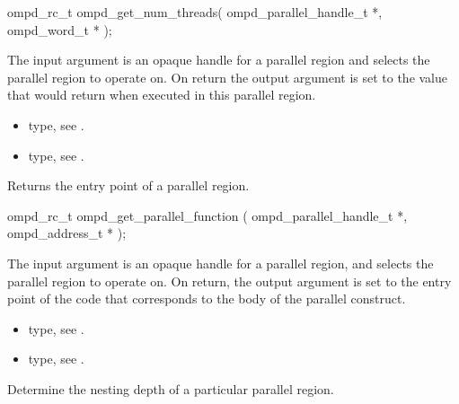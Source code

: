 \format
\cspecificstart
\begin{boxedcode}
ompd\_rc\_t ompd\_get\_num\_threads(
  ompd\_parallel\_handle\_t *,
  ompd\_word\_t *
);
\end{boxedcode}
\cspecificend

\descr

\argdesc
The input argument  is an opaque handle for a parallel region and selects the parallel region to operate on.
On return the output argument  is set to the value that  would return when
executed in this parallel region.

\crossreferences
\begin{itemize}
	\item {} type, see .
	\item {} type, see .
\end{itemize}

\label{ompd:ompd_get_parallel_function}
\summary
Returns the entry point of a parallel region.

\format
\cspecificstart
\begin{boxedcode}
ompd\_rc\_t ompd\_get\_parallel\_function (
  ompd\_parallel\_handle\_t  *,
  ompd\_address\_t          *
);
\end{boxedcode}
\cspecificend

\descr

\argdesc
The input argument  is an opaque handle for a
parallel region, and selects the parallel region to operate on.
On return,  the output argument  is set to the
entry point of the code that corresponds to the body of the parallel
construct.

\crossreferences
\begin{itemize}
	\item {} type, see .
	\item {} type, see .
\end{itemize}


\label{ompd:ompd_get_level}
\summary
Determine the nesting depth of a particular parallel region.

